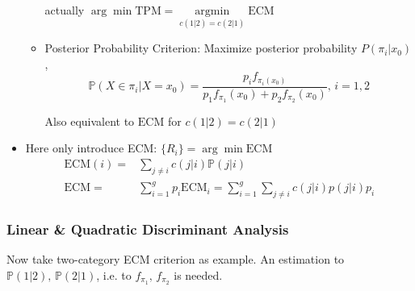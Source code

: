 \begin{itemize}[topsep=2pt,itemsep=2pt]
\begin{itemize}[topsep=2pt,itemsep=2pt]
    actually $ \arg\min\mathrm{TPM}=\mathop{\arg\min}\limits_{c(1|2)=c(2|1)} \mathrm{ECM} $
    \item Posterior Probability Criterion: Maximize posterior probability $ P(\pi_i|x_0) $,
    \begin{equation}
        \mathbb{P}(X\in\pi_i|X=x_0)=\dfrac{p_i f_{\pi_i(x_0)}}{p_1f_{\pi_1}(x_0)+p_2f_{\pi_2}(x_0)},\, i=1,2
    \end{equation}
    
    Also equivalent to $ \mathrm{ECM} $ for $ c(1|2)=c(2|1) $
\end{itemize}
    \item Here only introduce ECM: $ \{R_i\}=\arg\min\mathrm{ECM} $
    \begin{align}
        \mathrm{ECM}(i)=&\sum_{j\neq i}c(j|i)\mathbb{P}(j|i)\\
        \mathrm{ECM}=&\sum_{i=1}^gp_i\mathrm{ECM}_i=\sum_{i=1}^g\sum_{j\neq i} c(j|i)p(j|i)p_i
    \end{align}
\end{itemize}

    
    




    
\subsubsection{Linear \& Quadratic Discriminant Analysis}
    Now take two-category ECM criterion as example. An estimation to $ \mathbb{P}(1|2),\,\mathbb{P}(2|1) $, i.e. to $ f_{\pi_1},\,f_{\pi_2} $ is needed.

